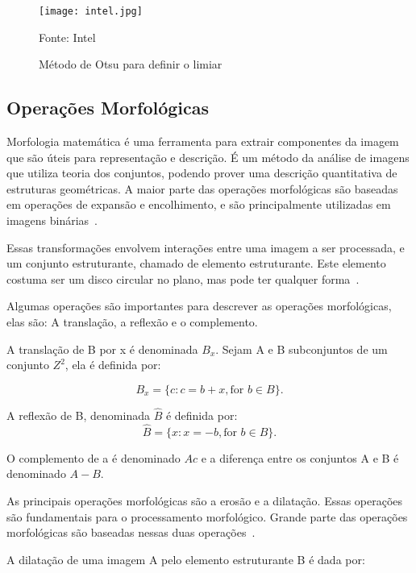 \begin{figure}[H]
	\centering
	\texttt{[image: intel.jpg]}
	\caption{Método de Otsu para definir o limiar}
Fonte: Intel~\cite{intel2017dev}
	\label{fig:otsu_ex}
\end{figure}

\subsection{Operações Morfológicas}
\label{sec:morfologicas}

Morfologia matemática é uma ferramenta para extrair componentes da imagem que são úteis para representação e descrição. É um método da análise de imagens que utiliza teoria dos conjuntos, podendo prover uma descrição quantitativa de estruturas geométricas. A maior parte das operações morfológicas são baseadas em operações de expansão e encolhimento, e são principalmente utilizadas em imagens binárias~\cite{owens1997morphology}.

Essas transformações envolvem interações entre uma imagem a ser processada, e um conjunto estruturante, chamado de elemento estruturante. Este elemento costuma ser um disco circular no plano, mas pode ter qualquer forma~\cite{owens1997morphology}.

Algumas operações são importantes para descrever as operações morfológicas, elas são: A translação, a reflexão e o complemento. 

A translação de B por x é denominada \(B_x\). Sejam A e B subconjuntos de um conjunto \(Z^2\), ela é definida por:

\begin{displaymath}
B_x = \{c : c = b + x, \mbox{for } b \in B\}. 
\end{displaymath}

A reflexão de B, denominada $\hat{B}$ é definida por:
\begin{displaymath}
\hat{B} = \{x : x = -b, \mbox{for } b \in B\}. 
\end{displaymath}

O complemento de a é denominado $Ac$ e a diferença entre os conjuntos A e B é denominado $A-B.$

As principais operações morfológicas são a erosão e a dilatação. Essas operações são fundamentais para o processamento morfológico. Grande parte das operações morfológicas são baseadas nessas duas operações~\cite{gonzalez1977digital}.

A dilatação de uma imagem A pelo elemento estruturante B é dada por:

